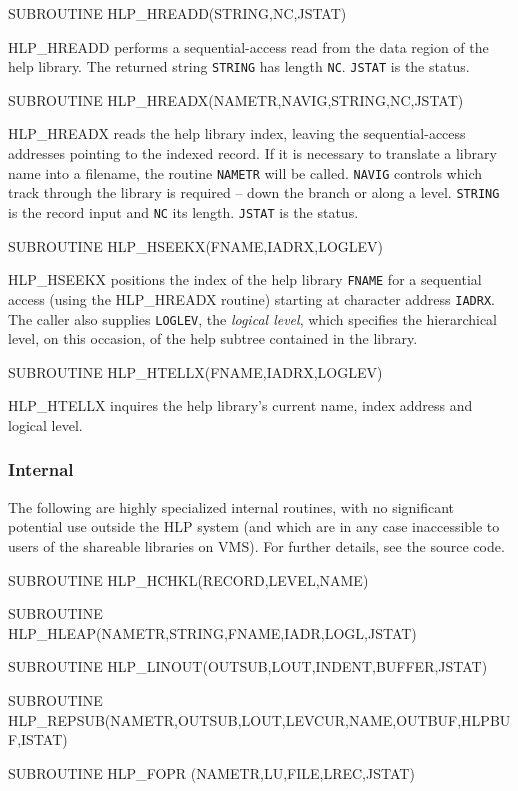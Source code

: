 \documentclass[11pt,nolof]{starlink}
\begin{document}
\begin{terminalv}
SUBROUTINE HLP_HREADD(STRING,NC,JSTAT)
\end{terminalv}
HLP\_HREADD performs a sequential-access read from the data
region of the help library.  The returned string
\texttt{STRING} has length \texttt{NC}.  \texttt{JSTAT} is the status.

\begin{terminalv}
SUBROUTINE HLP_HREADX(NAMETR,NAVIG,STRING,NC,JSTAT)
\end{terminalv}
HLP\_HREADX reads the help library index, leaving
the sequential-access addresses pointing to the indexed record.
If it is necessary to translate a library name into a filename,
the routine \texttt{NAMETR} will be called.
\texttt{NAVIG} controls which track through the library is
required -- down the branch or along a level.  \texttt{STRING} is
the record input and \texttt{NC} its length.  \texttt{JSTAT} is the
status.

\begin{terminalv}
SUBROUTINE HLP_HSEEKX(FNAME,IADRX,LOGLEV)
\end{terminalv}
HLP\_HSEEKX positions the index of the help library \texttt{FNAME}
for a sequential
access (using the HLP\_HREADX routine) starting at character address
\texttt{IADRX}.  The caller also supplies \texttt{LOGLEV},
the \textit{logical level}, which specifies the hierarchical level,
on this occasion, of the help subtree contained in the library.

\begin{terminalv}
SUBROUTINE HLP_HTELLX(FNAME,IADRX,LOGLEV)
\end{terminalv}
HLP\_HTELLX inquires the help library's current name, index address
and logical level.

\subsubsection{Internal}
The following are highly specialized internal routines, with no
significant potential use outside the HLP system (and which
are in any case
inaccessible to users of the shareable libraries on VMS).
For further details, see the source code.
\begin{terminalv}
SUBROUTINE HLP_HCHKL(RECORD,LEVEL,NAME)
\end{terminalv}
\begin{terminalv}
SUBROUTINE HLP_HLEAP(NAMETR,STRING,FNAME,IADR,LOGL,JSTAT)
\end{terminalv}
\begin{terminalv}
SUBROUTINE HLP_LINOUT(OUTSUB,LOUT,INDENT,BUFFER,JSTAT)
\end{terminalv}
\begin{terminalv}
SUBROUTINE HLP_REPSUB(NAMETR,OUTSUB,LOUT,LEVCUR,NAME,OUTBUF,HLPBUF,ISTAT)
\end{terminalv}
\begin{terminalv}
SUBROUTINE HLP_FOPR (NAMETR,LU,FILE,LREC,JSTAT)
\end{terminalv}
\end{document}
